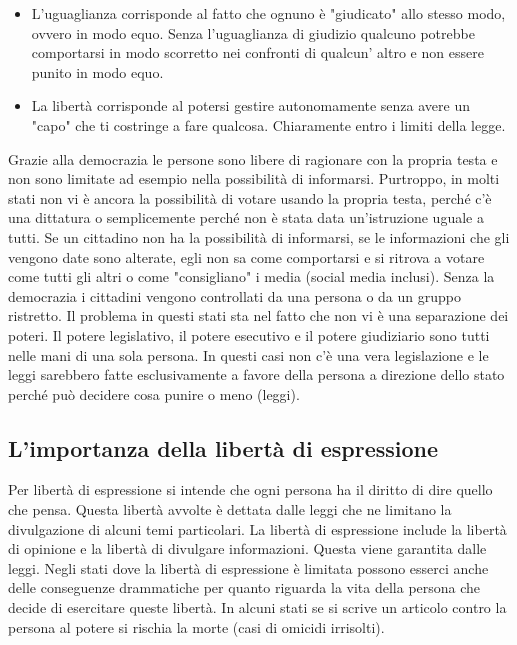 \documentclass[a4paper, 12pt]{article}
\begin{document}
\begin{itemize}
    \item L'uguaglianza corrisponde al fatto che ognuno è "giudicato" allo stesso modo, ovvero in modo equo. Senza l'uguaglianza di giudizio qualcuno potrebbe comportarsi in modo scorretto nei confronti di qualcun' altro e non essere punito in modo equo.
    \item La libertà corrisponde al potersi gestire autonomamente senza avere un "capo" che ti costringe a fare qualcosa. Chiaramente entro i limiti della legge.
\end{itemize}

Grazie alla democrazia le persone sono libere di ragionare con la propria testa e non sono limitate ad esempio nella possibilità di informarsi. Purtroppo, in molti stati non vi è ancora la possibilità di votare usando la propria testa, perché c'è una dittatura o semplicemente perché non è stata data un'istruzione uguale a tutti. Se un cittadino non ha la possibilità di informarsi, se le informazioni che gli vengono date sono alterate, egli non sa come comportarsi e si ritrova a votare come tutti gli altri o come "consigliano" i media (social media inclusi). Senza la democrazia i cittadini vengono controllati da una persona o da un gruppo ristretto. Il problema in questi stati sta nel fatto che non vi è una separazione dei poteri. Il potere legislativo, il potere esecutivo e il potere giudiziario sono tutti nelle mani di una sola persona. In questi casi non c'è una vera legislazione e le leggi sarebbero fatte esclusivamente a favore della persona a direzione dello stato perché può decidere cosa punire o meno (leggi).

\subsection{L'importanza della libertà di espressione}

Per libertà di espressione si intende che ogni persona ha il diritto di dire quello che pensa. Questa libertà avvolte è dettata dalle leggi che ne limitano la divulgazione di alcuni temi particolari. La libertà di espressione include la libertà di opinione e la libertà di divulgare informazioni. Questa viene garantita dalle leggi. Negli stati dove la libertà di espressione è limitata possono esserci anche delle conseguenze drammatiche per quanto riguarda la vita della persona che decide di esercitare queste libertà. In alcuni stati se si scrive un articolo contro la persona al potere si rischia la morte (casi di omicidi irrisolti).
\end{document}

